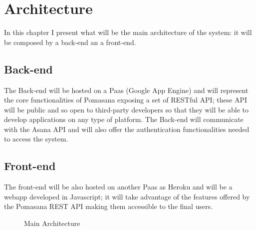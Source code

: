 



\chapter{Architecture}
\label{architectural_design}

In this chapter I present what will be the main architecture of the system: it will be composed by a back-end an a front-end.


	\section{Back-end}
	The Back-end will be hosted on a Paas (Google App Engine) and will represent the core functionalities of Pomasana exposing a set of RESTful API; these API will be public and so open to third-party developers so that they will be able to develop applications on any type of platform. The Back-end will communicate with the Asana API and will also offer the authentication functionalities needed to access the system.

	\section{Front-end}
	The front-end will be also hosted on another Paas as Heroku and will be a webapp developed in Javascript; it will take advantage of the features offered by the Pomasana REST API making them accessible to the final users.



		\begin{figure}[h!]
		  \centering
		  \caption{Main Architecture}
		\end{figure}
